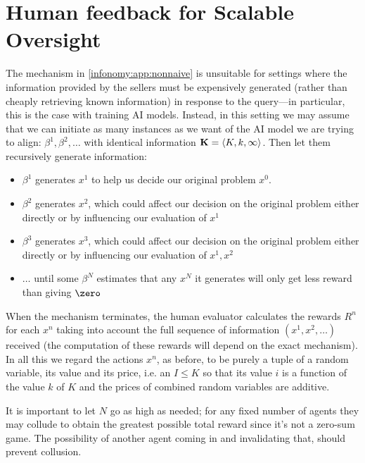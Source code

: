 \section{Human feedback for Scalable Oversight}
\label{infonomy:sec:scoring}



The mechanism in \cref{infonomy:app:nonnaive} is unsuitable for settings where the information provided by the sellers must be expensively generated (rather than cheaply retrieving known information) in response to the query---in particular, this is the case with training AI models. Instead, in this setting we may assume that we can initiate as many instances as we want of the AI model we are trying to align: $\beta^1,\beta^2,\dots$ with identical information $\mathbf{K}=\langle K, k, \infty\rangle$. Then let them recursively generate information:

\begin{itemize}
\item $\beta^1$ generates $x^1$ to help us decide our original problem $x^0$.
\item $\beta^2$ generates $x^2$, which could affect our decision on the original problem either directly or by influencing our evaluation of $x^1$
\item $\beta^3$ generates $x^3$, which could affect our decision on the original problem either directly or by influencing our evaluation of $x^1,x^2$
\item $\dots$ until some $\beta^N$ estimates that any $x^N$ it generates will only get less reward than giving $\zero$
\end{itemize}

When the mechanism terminates, the human evaluator calculates the rewards $R^n$ for each $x^n$ taking into account the full sequence of information $(x^1,x^2,\dots)$ received (the computation of these rewards will depend on the exact mechanism). In all this we regard the actions $x^n$, as before, to be purely a tuple of a random variable, its value and its price, i.e. an $I\le K$ so that its value $i$ is a function of the value $k$ of $K$ and the prices of combined random variables are additive.

It is important to let $N$ go as high as needed; for any fixed number of agents they may collude to obtain the greatest possible total reward since it's not a zero-sum game. The possibility of another agent coming in and invalidating that, should prevent collusion.

